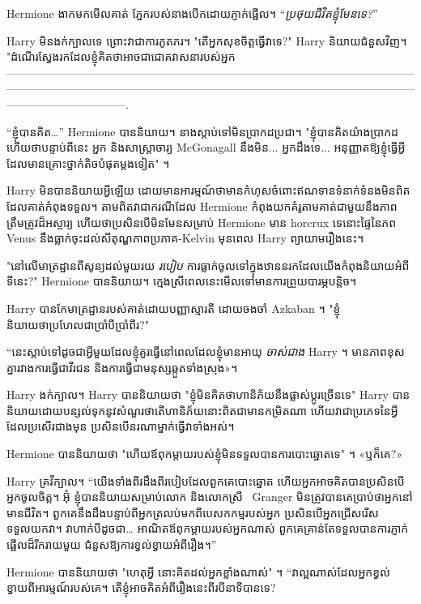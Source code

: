 {Hermione ងាកមកមើលគាត់ ភ្នែករបស់នាងបើកដោយភ្ញាក់ផ្អើល។ “\emph{ប្រថុយជីវិតខ្ញុំមែនទេ?}”

Harry មិន​ងក់​ក្បាល​ទេ ព្រោះ​វា​ជា​ការ​ភូតភរ។ "តើអ្នកសុខចិត្តធ្វើវាទេ?" Harry និយាយជំនួសវិញ។ "ដំណើរស្វែងរកដែលខ្ញុំគិតថាអាចជាជោគវាសនារបស់អ្នក--------------------------------------------------------------------------------------------------------------------------------------------------------------------------------------------------------------------------------------------------------.

“ខ្ញុំបានគិត…” Hermione បាននិយាយ។ នាងស្តាប់ទៅមិនប្រាកដប្រជា។ "ខ្ញុំបានគិតយ៉ាងប្រាកដហើយថាបន្ទាប់ពីនេះ អ្នក និងសាស្រ្តាចារ្យ McGonagall នឹងមិន... អ្នកដឹងទេ... អនុញ្ញាតឱ្យខ្ញុំធ្វើអ្វីដែលមានគ្រោះថ្នាក់តិចបំផុតម្តងទៀត" ។

Harry មិន​បាន​និយាយ​អ្វី​ឡើយ ដោយ​មាន​អារម្មណ៍​ថា​មាន​កំហុស​ចំពោះ​ឥណទាន​ទំនាក់ទំនង​មិន​ពិត​ដែល​គាត់​កំពុង​ទទួល។ តាមពិតវាជាករណីដែល Hermione កំពុងយកគំរូតាមគាត់ជាមួយនឹងភាពត្រឹមត្រូវដ៏អស្ចារ្យ ហើយថាប្រសិនបើមិនមែនសម្រាប់ Hermione មាន horcrux ទេនោះផ្ទៃនៃភព Venus នឹងធ្លាក់ចុះដល់សីតុណ្ហភាពប្រភាគ-Kelvin មុនពេល Harry ព្យាយាមរឿងនេះ។

"នៅលើមាត្រដ្ឋានពីសូន្យដល់មួយរយ \emph{របៀប} ការធ្លាក់ចូលទៅក្នុងឋាននរកដែលយើងកំពុងនិយាយអំពីទីនេះ?" Hermione បាននិយាយ។ ក្មេងស្រីពេលនេះមើលទៅមានការព្រួយបារម្ភបន្តិច។

Harry បានកែមាត្រដ្ឋានរបស់គាត់ដោយបញ្ញាស្មារតី ដោយចងចាំ Azkaban ។ "ខ្ញុំនិយាយថាប្រហែលជាប្រាំបីប្រាំពីរ?"

“នេះស្តាប់ទៅដូចជាអ្វីមួយដែលខ្ញុំគួរធ្វើនៅពេលដែលខ្ញុំមានអាយុ \emph{ចាស់ជាង} Harry ។ មាន​ភាព​ខុស​គ្នា​រវាង​ការ​ធ្វើ​ជា​វីរជន និង​ការ​ធ្វើ​ជា​មនុស្ស​ឆ្កួត​ទាំង​ស្រុង»។

Harry ងក់ក្បាល។ Harry បាននិយាយថា "ខ្ញុំមិនគិតថាហានិភ័យនឹងផ្លាស់ប្តូរច្រើនទេ" Harry បាននិយាយដោយបន្សល់ទុកនូវសំណួរថាតើហានិភ័យនោះពិតជាមានកម្រិតណា ហើយវាជាប្រភេទនៃអ្វីដែលប្រសើរជាងមុន ប្រសិនបើនរណាម្នាក់ធ្វើវាទាំងអស់។

Hermione បាននិយាយថា "ហើយឪពុកម្តាយរបស់ខ្ញុំមិនទទួលបានការបោះឆ្នោតទេ" ។ «ឬ​ក៏​គេ?»

Harry គ្រវីក្បាល។ “យើងទាំងពីរដឹងពីរបៀបដែលពួកគេបោះឆ្នោត ហើយអ្នកអាចគិតបានប្រសិនបើអ្នកចូលចិត្ត។ អ៊ុំ ខ្ញុំ​បាន​និយាយ​សម្រាប់​លោក និង​លោកស្រី ~Granger មិន​ត្រូវ​បាន​គេ​ប្រាប់​ថា​អ្នក​នៅ​មាន​ជីវិត។ ពួកគេនឹងដឹងបន្ទាប់ពីអ្នកត្រលប់មកពីបេសកកម្មរបស់អ្នក ប្រសិនបើអ្នកជ្រើសរើសទទួលយកវា។ វាហាក់បីដូចជា… អាណិតឪពុកម្តាយរបស់អ្នកណាស់ ពួកគេគ្រាន់តែទទួលបានការភ្ញាក់ផ្អើលដ៏រីករាយមួយ ជំនួសឱ្យការខ្វល់ខ្វាយអំពីរឿង។”

Hermione បាននិយាយថា "ហេតុអ្វី នោះគិតដល់អ្នកខ្លាំងណាស់" ។ “វាល្អណាស់ដែលអ្នកខ្វល់ខ្វាយពីអារម្មណ៍របស់គេ។ តើខ្ញុំអាចគិតអំពីរឿងនេះពីរបីនាទីបានទេ?

}
